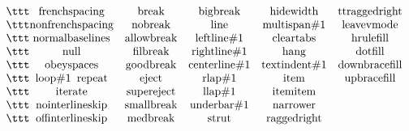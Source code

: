 $$\vbox{\halign{\ttt #\hfil\quad&&#\hfil\quad\cr
\\frenchspacing&\\break&\\bigbreak&\\hidewidth&\\ttraggedright\cr
\\nonfrenchspacing&\\nobreak&\\line&\\multispan\#1&\\leavevmode\cr
\\normalbaselines&\\allowbreak&\\leftline\#1&\\cleartabs&\\hrulefill\cr
\\null&\\filbreak&\\rightline\#1&\\hang&\\dotfill\cr
\\obeyspaces&\\goodbreak&\\centerline\#1&\\textindent\#1&\\downbracefill\cr
\\loop\#1\\repeat&\\eject&\\rlap\#1&\\item&\\upbracefill\cr
\\iterate&\\supereject&\\llap\#1&\\itemitem\cr
\\nointerlineskip&\\smallbreak&\\underbar\#1&\\narrower\cr
\\offinterlineskip&\\medbreak&\\strut&\\raggedright\cr}}$$
